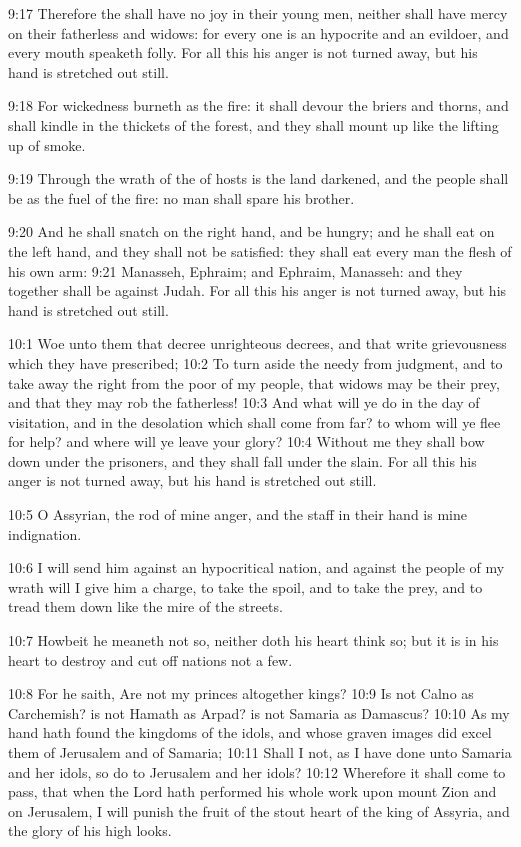 9:17 Therefore the \LORD shall have no joy in their young men, neither
shall have mercy on their fatherless and widows: for every one is an
hypocrite and an evildoer, and every mouth speaketh folly. For all
this his anger is not turned away, but his hand is stretched out
still.

9:18 For wickedness burneth as the fire: it shall devour the briers
and thorns, and shall kindle in the thickets of the forest, and they
shall mount up like the lifting up of smoke.

9:19 Through the wrath of the \LORD of hosts is the land darkened, and
the people shall be as the fuel of the fire: no man shall spare his
brother.

9:20 And he shall snatch on the right hand, and be hungry; and he
shall eat on the left hand, and they shall not be satisfied: they
shall eat every man the flesh of his own arm: 9:21 Manasseh, Ephraim;
and Ephraim, Manasseh: and they together shall be against Judah. For
all this his anger is not turned away, but his hand is stretched out
still.

10:1 Woe unto them that decree unrighteous decrees, and that write
grievousness which they have prescribed; 10:2 To turn aside the needy
from judgment, and to take away the right from the poor of my people,
that widows may be their prey, and that they may rob the fatherless!
10:3 And what will ye do in the day of visitation, and in the
desolation which shall come from far? to whom will ye flee for help?
and where will ye leave your glory?  10:4 Without me they shall bow
down under the prisoners, and they shall fall under the slain. For all
this his anger is not turned away, but his hand is stretched out
still.

10:5 O Assyrian, the rod of mine anger, and the staff in their hand is
mine indignation.

10:6 I will send him against an hypocritical nation, and against the
people of my wrath will I give him a charge, to take the spoil, and to
take the prey, and to tread them down like the mire of the streets.

10:7 Howbeit he meaneth not so, neither doth his heart think so; but
it is in his heart to destroy and cut off nations not a few.

10:8 For he saith, Are not my princes altogether kings?  10:9 Is not
Calno as Carchemish? is not Hamath as Arpad? is not Samaria as
Damascus?  10:10 As my hand hath found the kingdoms of the idols, and
whose graven images did excel them of Jerusalem and of Samaria; 10:11
Shall I not, as I have done unto Samaria and her idols, so do to
Jerusalem and her idols?  10:12 Wherefore it shall come to pass, that
when the Lord hath performed his whole work upon mount Zion and on
Jerusalem, I will punish the fruit of the stout heart of the king of
Assyria, and the glory of his high looks.

